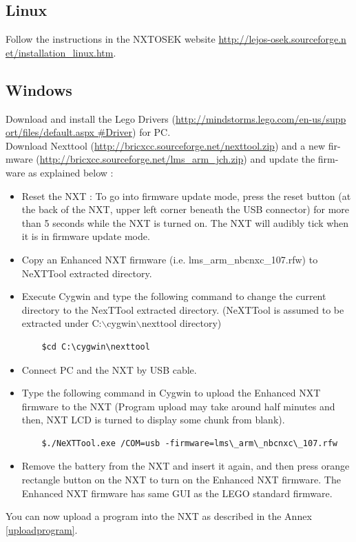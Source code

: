 \documentclass[10pt]{article}
\begin{document}
\subsection{Linux}
Follow the instructions in the NXTOSEK website \href{http://lejos-osek.sourceforge.net/installation_linux.htm}{http://lejos-osek.sourceforge.n et/installation\_linux.htm}.

\subsection{Windows}
Download and install the Lego Drivers (\href{http://mindstorms.lego.com/en-us/support/files/default.aspx#Driver}{http://mindstorms.lego.com/en-us/supp ort/files/default.aspx
\#Driver}) for PC. \\
Download Nexttool (\href{http://bricxcc.sourceforge.net/nexttool.zip}{http://bricxcc.sourceforge.net/nexttool.zip}) and a new fir-mware (\href{http://bricxcc.sourceforge.net/lms_arm_jch.zip}{http://bricxcc.sourceforge.net/lms\_arm\_jch.zip}) and update the firm-ware as explained below :
\begin{itemize}
\item Reset the NXT : To go into firmware update mode, press the reset button (at the back of the NXT, upper left corner beneath the USB connector) for more than 5 seconds while the NXT is turned on. The NXT will audibly tick when it is in firmware update mode.
\item Copy an Enhanced NXT firmware (i.e. lms\_arm\_nbcnxc\_107.rfw) to NeXTTool extracted directory.
\item Execute Cygwin and type the following command to change the current directory to the NexTTool extracted directory. (NeXTTool is assumed to be extracted under C:$\backslash$cygwin$\backslash$nexttool directory)
	\begin{verbatim}
	$cd C:\cygwin\nexttool
	\end{verbatim}
\item Connect PC and the NXT by USB cable.
\item Type the following command in Cygwin to upload the Enhanced NXT firmware to the NXT (Program upload may take around half minutes and then, NXT LCD is turned to display some chunk from blank).
	\begin{verbatim}
	$./NeXTTool.exe /COM=usb -firmware=lms\_arm\_nbcnxc\_107.rfw
	\end{verbatim}
\item Remove the battery from the NXT and insert it again, and then press orange rectangle button on the NXT to turn on the Enhanced NXT firmware. The Enhanced NXT firmware has same GUI as the LEGO standard firmware.
\end{itemize}
You can now upload a program into the NXT as described in the Annex \ref{uploadprogram}.
\end{document}
